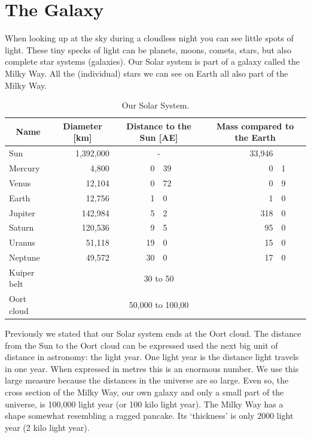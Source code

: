 \documentclass[12pt,a4paper]{article}
\numberwithin{equation}{section}
\numberwithin{figure}{section}
\numberwithin{table}{section}
\begin{document}
\section{The Galaxy}
When looking up at the sky during a cloudless night you can see little spots of light. These tiny specks of light can be planets, moons, comets, stars, but also complete star systems (galaxies). Our Solar system is part of a galaxy called the Milky Way. All the (individual) stars we can see on Earth all also part of the Milky Way.
\begin{table}[h]\begin{centering}
\begin{tabular}{|l|r|r@{.}l|r@{.}l|}
\hline \multicolumn{1}{|c|}{Name} & \multicolumn{1}{c|}{Diameter [km]} & \multicolumn{2}{c|}{Distance to the Sun [AE]} & \multicolumn{2}{c|}{Mass compared to the Earth} \\ \hline \hline
Sun & 1,392,000 & \multicolumn{2}{c|}{-} & 33,946& \\ \hline
Mercury & 4,800 & 0&39 & 0&1 \\ \hline
Venus & 12,104 & 0&72 & 0&9 \\ \hline
Earth & 12,756 & 1&0 & 1&0 \\ \hline
Jupiter & 142,984 & 5&2 & 318&0 \\ \hline
Saturn & 120,536 & 9&5 & 95&0 \\ \hline
Uranus & 51,118 & 19&0 & 15&0 \\ \hline
Neptune & 49,572 & 30&0 & 17&0 \\ \hline
Kuiper belt & & \multicolumn{2}{c|}{30 to 50} & \multicolumn{2}{c|}{}\\ \hline
Oort cloud & & \multicolumn{2}{c|}{50,000 to 100,00} & \multicolumn{2}{c|}{} \\ \hline
\end{tabular}
\caption{Our Solar System.}\label{tab:sol_sys}
\end{centering}\end{table}

Previously we stated that our Solar system ends at the Oort cloud. The distance from the Sun to the Oort cloud can be expressed used the next big unit of distance in astronomy: the light year. One light year is the distance light travels in one year. When expressed in metres this is an enormous number. We use this large measure because the distances in the universe are so large. Even so, the cross section of the Milky Way, our own galaxy and only a small part of the universe, is 100,000 light year (or 100 kilo light year). The Milky Way has a shape somewhat resembling a ragged pancake. Its `thickness' is only 2000 light year (2 kilo light year).
\end{document}
